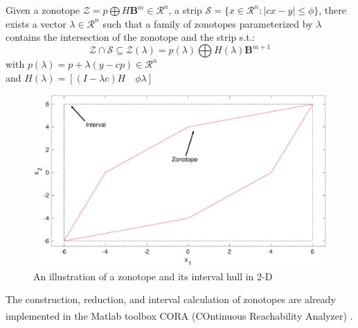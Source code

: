 \begin{lemma}\label{prop:intersect} \cite{Alamo2005}
Given a zonotope $\mathcal{Z} = p \bigoplus H\textbf{B}^m \in \mathcal{R}^n$,
 a strip $\mathscr{S} = \{x \in \mathcal{R}^n : |cx-y| \leq \phi\}$, there exists a vector $\lambda \in \mathcal{R}^n$ such that a family of zonotopes parameterized by $\lambda$ contains the intersection of the zonotope and the strip s.t.:
\begin{equation}
\mathcal{Z} \cap \mathscr{S} \subseteq \mathcal{Z}(\lambda) =  p(\lambda) \bigoplus H(\lambda) \textbf{B}^{m+1}
\end{equation} 
with $p(\lambda) = p + \lambda(y - cp) \in \mathcal{R}^n$ \\
and $H(\lambda) = [(I - \lambda c)H \quad \phi \lambda]$ 

\end{lemma}
\begin{figure}[!h]
\label{fig:zonotope}
\includegraphics[scale=1, width=\linewidth]{figures/zonotope}
\caption{An illustration of a zonotope and its interval hull in 2-D}
\end{figure}
The construction, reduction, and interval calculation of zonotopes are already implemented in the Matlab\textsuperscript{\tiny\textregistered} toolbox CORA (COntinuous Reachability Analyzer) \cite{Althoff2018}.
